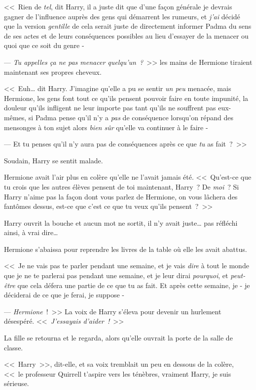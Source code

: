 <<~Rien de \emph{tel}, dit Harry, il a juste dit que d'une façon générale je devrais gagner de l'influence auprès des gens qui démarrent les rumeurs, et \emph{j'ai} décidé que la version \emph{gentille} de cela serait juste de directement informer Padma du sens de ses actes et de leurs conséquences possibles au lieu d'essayer de la menacer ou quoi que ce soit du genre -

--- \emph{Tu appelles ça ne pas menacer quelqu'un~?}~>> les mains de Hermione tiraient maintenant ses propres cheveux.

<<~Euh… dit Harry. J'imagine qu'elle a pu se sentir \emph{un peu} menacée, mais Hermione, les gens font tout ce qu'ils pensent pouvoir faire en toute impunité, la douleur qu'ils infligent ne leur importe pas tant qu'ils ne souffrent pas eux-mêmes, si Padma pense qu'il n'y a \emph{pas} de conséquence lorsqu'on répand des mensonges à ton sujet alors \emph{bien sûr} qu'elle va continuer à le faire -

--- Et tu penses qu'il n'y aura pas de conséquences après ce que \emph{tu} as fait~?~>>

Soudain, Harry se sentit malade.

Hermione avait l'air plus en colère qu'elle ne l'avait jamais été. <<~Qu'est-ce que tu crois que les autres élèves pensent de toi maintenant, Harry~? De \emph{moi}~? Si Harry n'aime pas la façon dont vous parlez de Hermione, on vous lâchera des fantômes dessus, est-ce que c'est ce que tu veux qu'ils pensent~?~>>

Harry ouvrit la bouche et aucun mot ne sortit, il n'y avait juste… pas réfléchi ainsi, à vrai dire…

Hermione s'abaissa pour reprendre les livres de la table où elle les avait abattus.

<<~Je ne vais pas te parler pendant une semaine, et je vais \emph{dire} à tout le monde que je ne te parlerai pas pendant une semaine, et je leur dirai \emph{pourquoi}, et \emph{peut-être} que cela défera une partie de ce que tu as fait. Et après cette semaine, je - je déciderai de ce que je ferai, je suppose -

--- \emph{Hermione}~!~>> La voix de Harry s'éleva pour devenir un hurlement désespéré. <<~\emph{J'essayais d'aider~!}~>>

La fille se retourna et le regarda, alors qu'elle ouvrait la porte de la salle de classe.

<<~Harry~>>, dit-elle, et sa voix tremblait un peu en dessous de la colère, <<~le professeur Quirrell t'aspire vers les ténèbres, vraiment Harry, je suis sérieuse.

